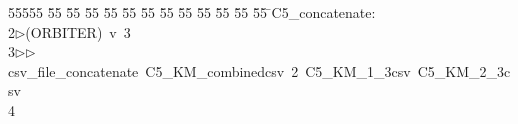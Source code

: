 %
%
\begin{tabbing}
55555 \= 55 \= 55 \= 55 \= 55 \= 55 \= 55 \= 55 \= 55 \= 55 \= 55 \= 55 \= 55 \= \>C5\_concatenate:\\[0pt]
2\>$\triangleright$\>(ORBITER)\ v\ 3\ \\[0pt]
3\>$\triangleright$\>$\triangleright$\>csv\_file\_concatenate\ C5\_KM\_combinedcsv\ 2\ C5\_KM\_1\_3csv\ C5\_KM\_2\_3csv\\[0pt]
4\>\end{tabbing}
